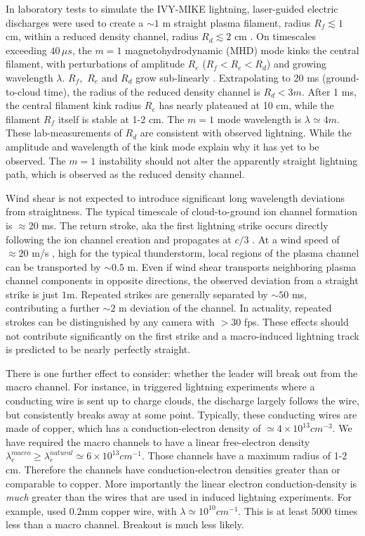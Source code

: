 \documentclass[%
 reprint,
 amsmath,amssymb,
 aps,
]{revtex4-2}
\begin{document}
        In laboratory tests to simulate the IVY-MIKE lightning, laser-guided electric discharges were used to create a ${\sim 1}$ m straight plasma filament, radius $R_f\lesssim 1$ cm, within a reduced density channel, radius $R_d \lesssim 2$ cm \citep[][fig. 6]{IVY-MIKE1987}. On timescales exceeding $40 \, \mu s$, the $m=1$ magnetohydrodynamic (MHD) mode kinks the central filament, with perturbations of amplitude $R_e$ ($R_f < R_e < R_d$) and growing wavelength $\lambda$. $R_f$,\, $R_e$ and $R_d$ grow sub-linearly \citep[][fig. 9]{IVY-MIKE1987}. Extrapolating to 20 ms (ground-to-cloud time), the radius of the reduced density channel is $R_d<3m$. After 1 ms, the central filament kink radius $R_e$ has nearly plateaued at 10 cm, while the filament $R_f$ itself is stable at 1-2 cm. The $m=1$ mode wavelength is $\lambda\simeq4 m$. These lab-measurements of $R_d$ are consistent with observed lightning. While the amplitude and wavelength of the kink mode explain why it has yet to be observed. The $m=1$ instability should not alter the apparently straight lightning path, which is observed as the reduced density channel.

        Wind shear is not expected to introduce significant long wavelength deviations from straightness. The typical timescale of cloud-to-ground ion channel formation is ${\approx 20}$ ms. The return stroke, aka the first lightning strike \citep{DwyerUman2014} occurs directly following the ion channel creation and propagates at $c/3$ \citep{Idone1987}. At a wind speed of ${\approx 20}$ m/s \citep{Choi2004}, high for the typical thunderstorm, local regions of the plasma channel can be transported by ${\sim 0.5}$ m. Even if wind shear transports neighboring plasma channel components in opposite directions, the observed deviation from a straight strike is just $1$m. Repeated strikes are generally separated by ${\sim 50}$ ms, contributing a further ${\sim 2}$ m deviation of the channel. In actuality, repeated strokes can be distinguished by any camera with $>30$ fps. These effects should not contribute significantly on the first strike and a macro-induced lightning track is predicted to be nearly perfectly straight.
        
        There is one further effect to consider: whether the leader will break out from the macro channel. For instance, in triggered lightning experiments where a conducting wire is sent up to charge clouds, the discharge largely follows the wire, but consistently breaks away at some point. Typically, these conducting wires are made of copper, which has a conduction-electron density of $\simeq 4 \times 10^{13} cm^{-3}$. We have required the macro channels to have a linear free-electron density $\lambda_e^{macro} \geq \lambda_e^{natural} \simeq 6 \times 10^{13} cm^{-1}$. Those channels have a maximum radius of 1-2 cm. Therefore the channels have conduction-electron densities greater than or comparable to copper. More importantly the linear electron conduction-density is \textit{much} greater than the wires that are used in induced lightning experiments. For example, \citeauthor{Betts2003} \citep{Betts2003} used 0.2mm copper wire, with $\lambda\simeq 10^{10} cm^{-1}$. This is at least 5000 times less than a macro channel. Breakout is much less likely.
\end{document}

